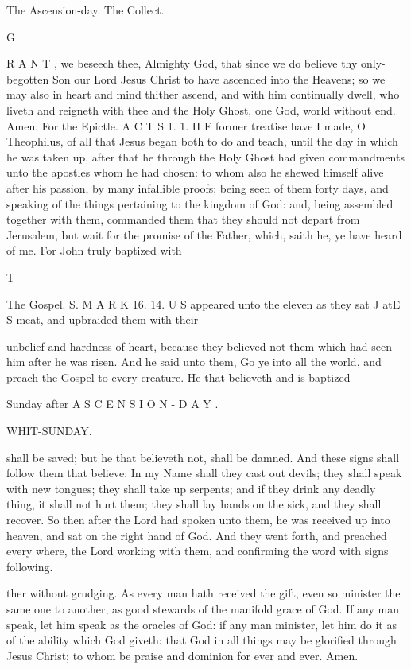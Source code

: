 The Ascension-day. The Collect.

G

R A N T , we beseech thee, Almighty God, that since we do believe thy only-begotten Son our Lord Jesus Christ to have ascended into the Heavens; so we may also in heart and mind thither ascend, and with him continually dwell, who liveth and reigneth with thee and the Holy Ghost, one God, world without end. Amen. For the Epictle. A C T S 1. 1. H E former treatise have I made, O Theophilus, of all that Jesus began both to do and teach, until the day in which he was taken up, after that he through the Holy Ghost had given commandments unto the apostles whom he had chosen: to whom also he shewed himself alive after his passion, by many infallible proofs; being seen of them forty days, and speaking of the things pertaining to the kingdom of God: and, being assembled together with them, commanded them that they should not depart from Jerusalem, but wait for the promise of the Father, which, saith he, ye have heard of me. For John truly baptized with

T

The Gospel. S. M A R K 16. 14. U S appeared unto the eleven as they sat J atE S meat, and upbraided them with their

unbelief and hardness of heart, because they believed not them which had seen him after he was risen. And he said unto them, Go ye into all the world, and preach the Gospel to every creature. He that believeth and is baptized

Sunday after A S C E N S I O N - D A Y .

WHIT-SUNDAY.

shall be saved; but he that believeth not, shall be damned. And these signs shall follow them that believe: In my Name shall they cast out devils; they shall speak with new tongues; they shall take up serpents; and if they drink any deadly thing, it shall not hurt them; they shall lay hands on the sick, and they shall recover. So then after the Lord had spoken unto them, he was received up into heaven, and sat on the right hand of God. And they went forth, and preached every where, the Lord working with them, and confirming the word with signs following.

ther without grudging. As every man hath received the gift, even so minister the same one to another, as good stewards of the manifold grace of God. If any man speak, let him speak as the oracles of God: if any man minister, let him do it as of the ability which God giveth: that God in all things may be glorified through Jesus Christ; to whom be praise and dominion for ever and ever. Amen.

